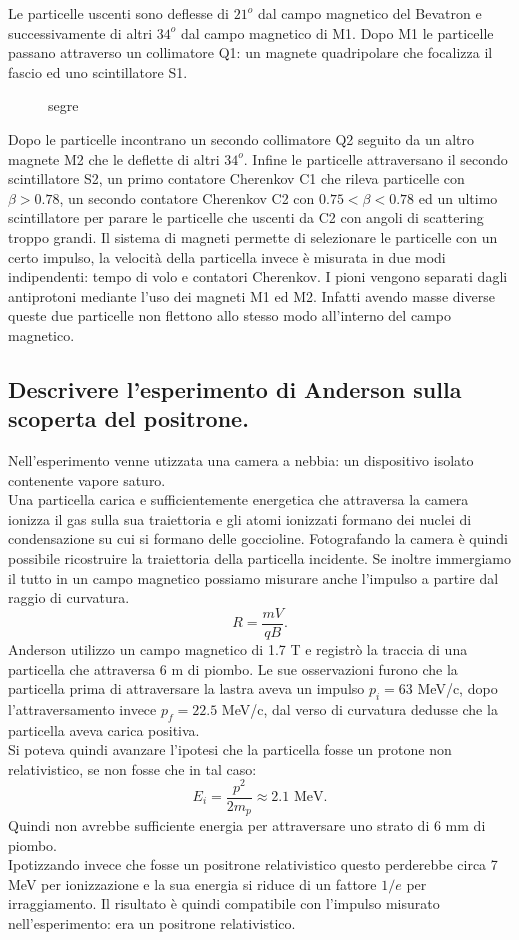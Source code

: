 Le particelle uscenti sono deflesse di $21^o$ dal campo magnetico del Bevatron e successivamente di altri $34^o$ dal campo magnetico di M1. Dopo M1 le particelle passano attraverso un collimatore Q1: un magnete quadripolare che focalizza il fascio ed uno scintillatore S1. 
\begin{figure}[H]
    \centering
    \caption{segre}
    \label{fig:segre}
\end{figure}
Dopo le particelle incontrano un secondo collimatore Q2 seguito da un altro magnete M2 che le deflette di altri $34^o$. Infine le particelle attraversano il secondo scintillatore S2, un primo contatore Cherenkov C1 che rileva particelle con $\beta>0.78$, un secondo contatore Cherenkov C2 con $0.75< \beta<0.78$ ed un ultimo scintillatore per parare le particelle che uscenti da C2 con angoli di scattering troppo grandi.
Il sistema di magneti permette di selezionare le particelle con un certo impulso, la velocità della particella invece è misurata in due modi indipendenti: tempo di volo e contatori Cherenkov.
I pioni vengono separati dagli antiprotoni mediante l'uso dei magneti M1 ed M2. Infatti avendo masse diverse queste due particelle non flettono allo stesso modo all'interno del campo magnetico.

\subsection[]{Descrivere l’esperimento di Anderson sulla scoperta del positrone.
}\label{sec:4.a.34}
Nell'esperimento venne utizzata una camera a nebbia: un dispositivo isolato contenente vapore saturo. \\ 
Una particella carica e sufficientemente energetica che attraversa la camera ionizza il gas sulla sua traiettoria e gli atomi ionizzati formano dei nuclei di condensazione su cui si formano delle goccioline. Fotografando la camera è quindi possibile ricostruire la traiettoria della particella incidente. Se inoltre immergiamo il tutto in un campo magnetico possiamo misurare anche l'impulso a partire dal raggio di curvatura.
\[
	R = \frac{mV}{qB}
.\] 
Anderson utilizzo un campo magnetico di 1.7 T e registrò la traccia di una particella che attraversa 6 m di piombo. Le sue osservazioni furono che la particella prima di attraversare la lastra aveva un impulso $p_{i}=63$ MeV/c, dopo l'attraversamento invece $p_{f}=22.5$ MeV/c, dal verso di curvatura dedusse che la particella aveva carica positiva.\\
Si poteva quindi avanzare l'ipotesi che la particella fosse un protone non relativistico, se non fosse che in tal caso:
\[
	E_{i}= \frac{p^2}{2m_{p}}\approx 2.1 \text{ MeV}
.\] 
Quindi non avrebbe sufficiente energia per attraversare uno strato di 6 mm di piombo.\\
Ipotizzando invece che fosse un positrone relativistico questo perderebbe circa 7 MeV per ionizzazione e la sua energia si riduce di un fattore $1 /e$ per irraggiamento. Il risultato è quindi compatibile con l'impulso misurato nell'esperimento: era un positrone relativistico.

